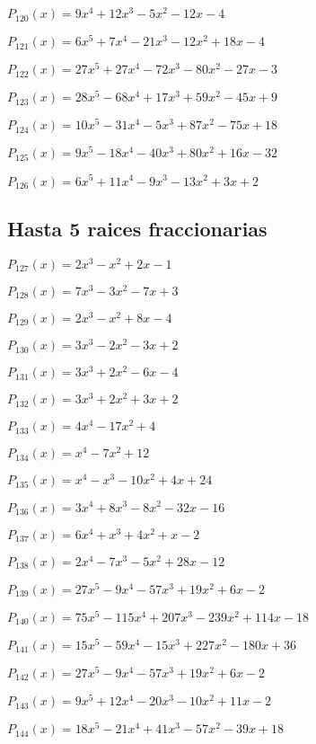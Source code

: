 \subitem $P_{120}(x) = 9x^4 + 12x^3 - 5x^2 - 12x - 4$


\subitem $P_{121}(x) = 6x^5 + 7x^4 - 21x^3 - 12x^2 + 18x - 4$

\subitem $P_{122}(x) = 27x^5 + 27x^4 - 72x^3 - 80x^2 - 27x - 3$

\subitem $P_{123}(x) = 28x^5 - 68x^4 + 17x^3 + 59x^2 - 45x + 9$

\subitem $P_{124}(x) = 10x^5 - 31x^4 - 5x^3 + 87x^2 - 75x + 18$

\subitem $P_{125}(x) = 9x^5 - 18x^4 - 40x^3 + 80x^2 + 16x - 32$

\subitem $P_{126}(x) = 6x^5 + 11x^4 - 9x^3 - 13x^2 + 3x + 2$

\subsection{Hasta 5 raices fraccionarias}

\subitem $P_{127}(x) = 2x^3 - x^2 + 2x - 1$

\subitem $P_{128}(x) = 7x^3 - 3x^2 - 7x + 3$

\subitem $P_{129}(x) = 2x^3 - x^2 + 8x - 4$

\subitem $P_{130}(x) = 3x^3 - 2x^2 - 3x + 2$

\subitem $P_{131}(x) = 3x^3 + 2x^2 - 6x - 4$

\subitem $P_{132}(x) = 3x^3 + 2x^2 + 3x + 2$


\subitem $P_{133}(x) = 4x^4 - 17x^2 + 4$

\subitem $P_{134}(x) = x^4 - 7x^2 + 12$

\subitem $P_{135}(x) = x^4 - x^3 - 10x^2 + 4x + 24$

\subitem $P_{136}(x) = 3x^4 + 8x^3 - 8x^2 - 32x - 16$

\subitem $P_{137}(x) = 6x^4 + x^3 + 4x^2 + x - 2$

\subitem $P_{138}(x) = 2x^4 - 7x^3 - 5x^2 + 28x - 12$


\subitem $P_{139}(x) = 27x^5 - 9x^4 - 57x^3 + 19x^2 + 6x - 2$

\subitem $P_{140}(x) = 75x^5 - 115x^4 + 207x^3 - 239x^2 + 114x - 18$

\subitem $P_{141}(x) = 15x^5 - 59x^4 - 15x^3 + 227x^2 - 180x + 36$

\subitem $P_{142}(x) = 27x^5 - 9x^4 - 57x^3 + 19x^2 + 6x - 2$

\subitem $P_{143}(x) = 9x^5 + 12x^4 - 20x^3 - 10x^2 + 11x - 2$

\subitem $P_{144}(x) = 18x^5 - 21x^4 + 41x^3 - 57x^2 - 39x + 18$

